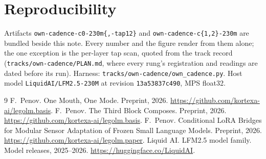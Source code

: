 \documentclass[11pt]{article}
\begin{document}
\section{Reproducibility}

Artifacts \texttt{own-cadence-c0-230m\{,-tap12\}} and
\texttt{own-cadence-c\{1,2\}-230m} are bundled beside this note.
Every number and the figure render from them alone; the one exception is
the per-layer tap scan, quoted from the track record
(\texttt{tracks/own-cadence/PLAN.md}, where every rung's registration
and readings are dated before its run). Harness:
\texttt{tracks/own-cadence/own\_cadence.py}. Host model
\texttt{LiquidAI/LFM2.5-230M} at revision
\texttt{13a53837c490}, MPS float32.

\begin{thebibliography}{9}
 F.~Penov. One Mouth, One Mode. Preprint,
2026. \url{https://github.com/kortexa-ai/legolm.basis}.
 F.~Penov. The Third Block Composes.
Preprint, 2026. \url{https://github.com/kortexa-ai/legolm.basis}.
 F.~Penov. Conditional LoRA Bridges for
Modular Sensor Adaptation of Frozen Small Language Models. Preprint,
2026. \url{https://github.com/kortexa-ai/legolm.paper}.
 Liquid AI. LFM2.5 model family. Model releases,
2025--2026. \url{https://huggingface.co/LiquidAI}.
\end{thebibliography}
\end{document}
